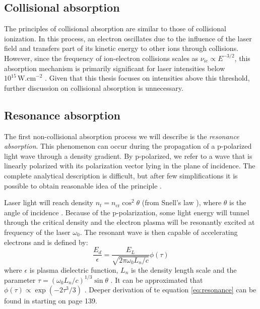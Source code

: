 \subsection*{Collisional absorption}
The principles of collisional absorption are similar to those of collisional ionization. In this process, an electron oscillates due to the influence of the laser field and transfers part of its kinetic energy to other ions through collisions. However, since the frequency of ion-electron collisions scales as $\nu_{ie} \propto E^{-3/2}$, this absorption mechanism is primarily significant for laser intensities below $10^{15}\,\mathrm{W.cm}^{-2}$ \cite{absorption1}. Given that this thesis focuses on intensities above this threshold, further discussion on collisional absorption is unnecessary.

\subsection*{Resonance absorption}
The first non-collisional absorption process we will describe is the \textit{resonance absorption}. This phenomenon can occur during the propagation of a p-polarized light wave through a density gradient. By p-polarized, we refer to a wave that is linearly polarized with its polarization vector lying in the plane of incidence. The complete analytical description is difficult, but after few simplifications it is possible to obtain reasonable idea of the principle \cite{laser-plasma6}. 

Laser light will reach density $n_t = n_{\mathrm{cr}}\cos^2\theta$ (from Snell's law \cite{absorption2}), where $\theta$ is the angle of incidence \cite{laser-plasma6}. Because of the p-polarization, some light energy will tunnel through the critical density and the electron plasma will be resonantly excited at frequency of the laser $\omega_0$. The resonant wave is then capable of accelerating electrons and is defined by:
\begin{equation}
	\label{eq:resonance}
	\frac{E_d}{\epsilon} = \frac{E_L}{\sqrt{2\pi\omega_0 L_n/c}}\phi\left(\tau\right)
\end{equation}
where $\epsilon$ is plasma dielectric function, $L_n$ is the density length scale and the parameter $\tau= \left(\omega_0 L_n/c\right)^{1/3}\sin\theta$ \cite{absorption2}. It can be approximated that $\phi\left(\tau\right) \propto \exp\left(-2\tau^3/3\right)$ \cite{laser-plasma6}.
Deeper derivation of te equation \ref{eq:resonance} can be found in \cite{laser-plasma6} starting on page 139.

